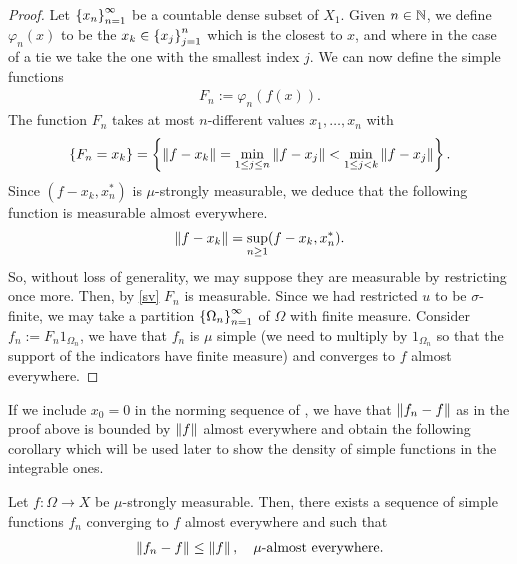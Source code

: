 \documentclass[
    a4paper,
    DIV=14,
    abstract=true,
    numbers=noenddot
]{scrartcl}
\begin{document}
\begin{proof}
	Let $\left\{x_n\right\}_{n=1}^\infty$ be a countable dense subset of $X_1$. Given $n \in \mathbb{N}$, we define $\varphi_n (x)$ to be the $x_k \in \left\{x_j\right\}_{j=1}^ n$ which is the closest to $x$, and where in the case of a tie we take the one with the smallest index $j$. We can now define the simple functions
	\begin{align*}
		F_n := \varphi _n(f(x)).
	\end{align*}
	The function $F_n$ takes at most $n$-different values $x_1,\dots, x_n$ with
	\begin{align}\label{sv}
		\left\{F_n=x_k\right\}=\left\{\left\lVert f- x_k \right\rVert = \min_{1\leq j \leq n} \left\lVert f- x_j \right\rVert < \min_{1 \leq j <k} \left\lVert f-x_j \right\rVert\right\}.
	\end{align}
	Since $(f-x_k,x_n^*)$ is $\mu$-strongly measurable, we deduce that the following function is measurable almost everywhere. \begin{align*}
		\left\lVert f- x_k \right\rVert= \sup_{n \geq1} (f- x_k,x_n^*).
	\end{align*}
	So, without loss of generality, we may suppose they are measurable by restricting once more. Then, by \eqref{sv} $F_n$ is measurable. Since we had restricted $u$ to be $\sigma $-finite, we may take a partition $\left\{\Omega _n\right\}_{n=1}^\infty$ of $\Omega$ with finite measure. Consider $f_n:=F_n 1_{\Omega _n}$, we have that $f_n$ is $\mu $ simple (we need to multiply by $1_{\Omega _n}$ so that the support of the indicators have finite measure) and converges to $f$ almost everywhere.
\end{proof}

If we include $x_0=0$ in the norming sequence of , we have that $\left\lVert f_n-f \right\rVert$ as in the proof above is bounded by $\left\lVert f \right\rVert$ almost everywhere and obtain the following corollary which will be used later to show the density of simple functions in the integrable ones.
\begin{corollary}\label{density corollary}
	Let $f : \Omega \to X$ be $\mu $-strongly measurable. Then, there exists a sequence of simple functions $f_n$ converging to $f$ almost everywhere and such that
	\begin{align*}
		\left\lVert f_n-f \right\rVert \leq \left\lVert f \right\rVert, \quad \mu \text{-almost everywhere}.
	\end{align*}
\end{corollary}
\end{document}
